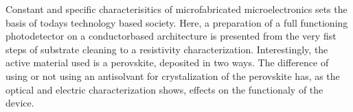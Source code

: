 
Constant and specific characterisitics of microfabricated microelectronics sets the basis of todays technology based society.
Here, a preparation of a full functioning photodetector on a conductorbased architecture is presented from the very fist steps of substrate cleaning to a resistivity characterization.
Interestingly, the active material used is a perovskite, deposited in two ways. 
The difference of using or not using an antisolvant for crystalization of the perovskite has, as the optical and electric
characterization shows, effects on the functionaly of the device.